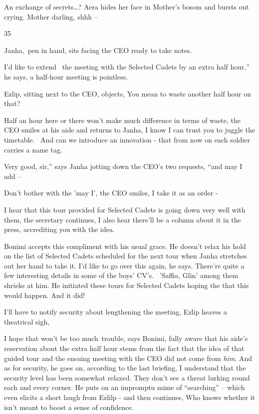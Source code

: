 \documentclass[letterpaper]{article}
\begin{document}
{\textquotedbl}An exchange of secrets{\dots}?{\textquotedbl} Aera hides her face in Mother's bosom and bursts out
crying. {\textquotedbl}Mother darling, shhh --{\textquotedbl} 


\bigskip

35 

Janha,~pen in hand, sits facing the CEO ready to take notes.

{\textquotedbl}I'd like to extend \ the meeting with the Selected Cadets by an extra half hour,'' he says,
{\textquotedbl}a half-hour meeting is pointless.{\textquotedbl}\textcolor{red}{ }

Ezlip, sitting next to the CEO, objects, {\textquotedbl}You mean to waste another half hour on that?{\textquotedbl} 

{\textquotedbl}Half an hour here or there won't make much difference in terms of waste,{\textquotedbl} the CEO smiles at
his aide and returns to Janha, {\textquotedbl}I know I can trust you to juggle the timetable. ~And can we introduce an
innovation - that from now on each soldier\textcolor{red}{ }carries a name tag.{\textquotedbl} 

{\textquotedbl}Very good, sir,'' says Janha jotting down the CEO's two requests, ``and may I add --{\textquotedbl} 

{\textquotedbl}Don't bother with the 'may I',{\textquotedbl} the CEO smiles, {\textquotedbl}I take it\textcolor{red}{
}as an order -{\textquotedbl}

{\textquotedbl}I hear that this tour provided for Selected Cadets is going down very well with them,{\textquotedbl} the
secretary continues, {\textquotedbl}I also hear there'll be a column about it in the press, accrediting you with the
idea.{\textquotedbl} 

Bonimi accepts this compliment with his usual grace. He doesn't relax his hold on the list of Selected
Cadets\textcolor{red}{ }scheduled for the next tour when Janha stretches out her hand to take it. {\textquotedbl}I'd
like to go over this again,{\textquotedbl} he says. {\textquotedbl}There're quite a few interesting details in some of
the boys' CV's.{\textquotedbl} \ {}'Saffia, Glin' among them shrieks at him. He initiated these tours for Selected
Cadets hoping the that this would happen. And\textcolor[rgb]{0.0,0.4392157,0.7529412}{ }it did!~~ 

{\textquotedbl} I'll have to notify security about lengthening the meeting,{\textquotedbl} Ezlip heaves a theatrical
sigh,

{\textquotedbl}I hope that won't be too much~trouble,{\textquotedbl} says Bonimi, fully aware that his aide's
reservation about the extra half hour stems from the fact that the idea of that guided tour and the\textcolor{red}{
}ensuing meeting with the CEO did not come from \textit{him}. {\textquotedbl}And as for security,{\textquotedbl} he
goes on, {\textquotedbl}according to the last briefing, I understand that the security level has been somewhat relaxed.
They don't see a threat lurking round each and every corner.{\textquotedbl} He puts on an impromptu mime of
``searching'' -- which even elicits a short laugh from Ezlilp - and then continues, {\textquotedbl}Who knows whether it
isn't meant to boost a sense of confidence.{\textquotedbl} 
\end{document}
